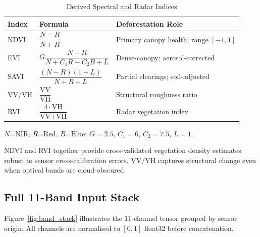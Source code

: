 \documentclass[10pt,conference]{IEEEtran}
\begin{document}
\begin{table}[!t]
  \caption{Derived Spectral and Radar Indices}
  \label{tab:indices}
  \centering
  \small
  \renewcommand{\arraystretch}{1.55}
  \begin{tabular}{l l p{2.55cm}}
    \toprule
    \textbf{Index} & \textbf{Formula} & \textbf{Deforestation Role} \\
    \midrule
    NDVI  & $\dfrac{N-R}{N+R}$
          & Primary canopy health; range $[-1,1]$ \\
    EVI   & $G\dfrac{N-R}{N+C_1 R - C_2 B + L}$
          & Dense-canopy; aerosol-corrected \\
    SAVI  & $\dfrac{(N-R)(1+L)}{N+R+L}$
          & Partial clearings; soil-adjusted \\
    VV/VH & $\dfrac{\text{VV}}{\text{VH}}$
          & Structural roughness ratio \\
    RVI   & $\dfrac{4\cdot\text{VH}}{\text{VV}+\text{VH}}$
          & Radar vegetation index \\
    \bottomrule
  \end{tabular}
  {\footnotesize $N$=NIR, $R$=Red, $B$=Blue; $G{=}2.5$, $C_1{=}6$, $C_2{=}7.5$, $L{=}1$.}
\end{table}

NDVI and RVI together provide cross-validated vegetation density estimates robust
to sensor cross-calibration errors. VV/VH captures structural change even when
optical bands are cloud-obscured.

\subsection{Full 11-Band Input Stack}

Figure~\ref{fig:band_stack} illustrates the 11-channel tensor grouped by sensor
origin. All channels are normalised to $[0,1]$ float32 before concatenation.
\end{document}
